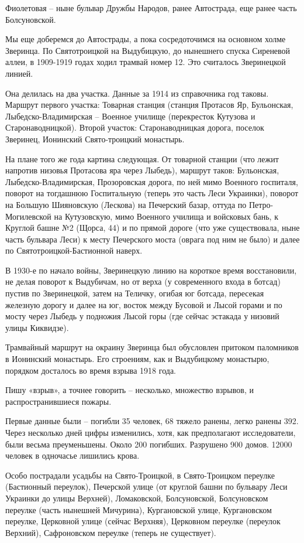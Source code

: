 Фиолетовая – ныне бульвар Дружбы Народов, ранее Автострада, еще ранее часть Болсуновской.

Мы еще доберемся до Автострады, а пока сосредоточимся на основном холме Зверинца. По Святотроицкой на Выдубицкую, до нынешнего спуска Сиреневой аллеи, в 1909-1919 годах ходил трамвай номер 12. Это считалось Зверинецкой линией.

Она делилась на два участка. Данные за 1914 из справочника год таковы. Маршрут первого участка: Товарная станция (станция Протасов Яр, Бульонская, Лыбедско-Владимирская – Военное училище (перекресток Кутузова и Старонаводницкой). Второй участок: Старонаводницкая дорога, поселок Зверинец, Ионинский Свято-троицкий монастырь.

На плане того же года картина следующая. От товарной станции (что лежит напротив низовья Протасова яра через Лыбедь), маршрут таков: Бульонская, Лыбедско-Владимирская, Прозоровская дорога, по ней мимо Военного госпиталя, поворот на тогдашнюю Госпитальную (теперь это часть Леси Украинки), поворот на Большую Шияновскую (Лескова) на Печерский базар, оттуда по Петро-Могилевской на Кутузовскую, мимо Военного училища и войсковых бань, к Круглой башне №2 (Щорса, 44) и по прямой дороге (что уже существовала, ныне часть бульвара Леси) к месту Печерского моста (оврага под ним не было) и далее по Святотроицкой-Бастионной наверх.

В 1930-е по начало войны, Зверинецкую линию на короткое время восстановили, не делая поворот к Выдубичам, но от верха (у современного входа в ботсад) пустив по Зверинецкой, затем на Теличку, огибая юг ботсада, пересекая железную дорогу и далее на юг, восток между Бусовой и Лысой горами и по мосту через Лыбедь у подножия Лысой горы (где сейчас эстакада у низовий улицы Киквидзе).

Трамвайный маршрут на окраину Зверинца был обусловлен притоком паломников в Ионинский монастырь. Его строениям, как и Выдубицкому монастырю, порядком досталось во время взрыва 1918 года.

Пишу «взрыв», а точнее говорить – несколько, множество взрывов, и распространившиеся пожары.

Первые данные были – погибли 35 человек, 68 тяжело ранены, легко ранены 392. Через несколько дней цифры изменились, хотя, как предполагают исследователи, были весьма преуменьшены. Около 200 погибших. Разрушено 900 домов. 12000 человек в одночасье лишились крова.

Особо пострадали усадьбы на Свято-Троицкой, в Свято-Троицком переулке (Бастионный переулок), Печерской улице (от круглой башни по бульвару Леси Украинки до улицы Верхней), Ломаковской, Болсуновской,  Болсуновском переулке (часть нынешней Мичурина), Кургановской улице, Кургановском переулке, Церковной улице (сейчас Верхняя), Церковном переулке (переулок Верхний), Сафроновском переулке (теперь не существует).

